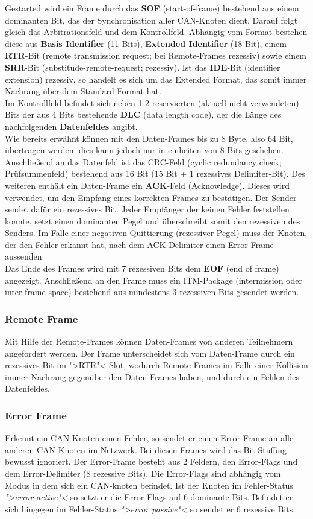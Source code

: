 Gestarted wird ein Frame durch das \textbf{SOF} (start-of-frame)
bestehend aus einem dominanten Bit, das der Synchronisation aller CAN-Knoten dient. Darauf folgt gleich das
Arbitrationsfeld und dem Kontrollfeld. Abhängig vom Format bestehen
diese aus \textbf{Basis Identifier} (11 Bits), \textbf{Extended
Identifier} (18 Bit), einem \textbf{RTR}-Bit (remote transmission
request; bei Remote-Frames rezessiv) sowie einem \textbf{SRR}-Bit
(substitude-remote-request; rezessiv). Ist das \textbf{IDE}-Bit
(identifier extension) rezessiv, so handelt es sich um das Extended
Format, das somit immer Nachrang über dem Standard Format hat.\\ Im
Kontrollfeld befindet sich neben 1-2 reservierten (aktuell nicht
verwendeten) Bits der aus 4 Bits bestehende \textbf{DLC} (data length
code), der die Länge des nachfolgenden \textbf{Datenfeldes} angibt.\\
Wie bereits erwähnt können mit den Daten-Frames bis zu 8 Byte, also 64
Bit, übertragen werden. dies kann jedoch nur in einheiten von 8 Bits
geschehen. Anschließend an das Datenfeld ist das CRC-Feld (cyclic
redundancy check; Prüfsummenfeld) bestehend aus 16 Bit (15 Bit + 1
rezessives Delimiter-Bit). Des weiteren enthält ein Daten-Frame ein
\textbf{ACK}-Feld (Acknowledge). Dieses wird verwendet, um den Empfang
eines korrekten Frames zu bestätigen. Der Sender sendet dafür ein
rezessives Bit. Jeder Empfänger der keinen Fehler feststellen konnte,
setzt einen dominanten Pegel und überschreibt somit den rezessiven des
Senders. Im Falle einer negativen Quittierung (rezessiver Pegel) muss
der Knoten, der den Fehler erkannt hat, nach dem ACK-Delimiter einen
Error-Frame aussenden.\\Das Ende des Frames wird mit 7 rezessiven Bits
dem \textbf{EOF} (end of frame) angezeigt. Anschließend an den Frame
muss ein ITM-Package (intermission oder inter-frame-space) bestehend
aus mindestens 3 rezessiven Bits gesendet werden.
	
\subsubsection{Remote Frame} Mit Hilfe der Remote-Frames können
Daten-Frames von anderen Teilnehmern angefordert werden. Der Frame
unterscheidet sich vom Daten-Frame durch ein rezessives Bit im
">RTR"<-Slot, wodurch Remote-Frames im Falle einer Kollision immer
Nachrang gegenüber den Daten-Frames haben, und durch ein Fehlen des
Datenfeldes.
	
\subsubsection{Error Frame} Erkennt ein CAN-Knoten einen Fehler, so
sendet er einen Error-Frame an alle anderen CAN-Knoten im Netzwerk.
Bei diesen Frames wird das Bit-Stuffing bewusst ignoriert. Der
Error-Frame besteht aus 2 Feldern, den Error-Flags und dem
Error-Delimiter (8 rezessive Bits). Die Error-Flags sind abhängig vom
Modus in dem sich ein CAN-knoten befindet. Ist der Knoten im
Fehler-Status \textit{">error active"<} so setzt er die Error-Flags
auf 6 dominante Bits. Befindet er sich hingegen im Fehler-Status
\textit{">error passive"<} so sendet er 6 rezessive Bits.
	
